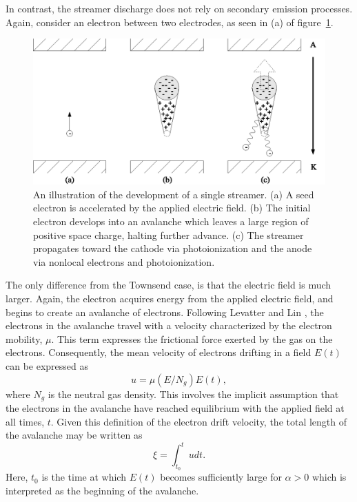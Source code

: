 {In contrast, the streamer discharge does not rely on secondary emission
processes. Again, consider an electron between two electrodes, as seen in (a) of
figure~\ref{fig:streamer}.
\begin{figure}
  \centering
  \includegraphics{./chapters/theory/figures/streamer.eps}
  \caption{An illustration of the development of a single streamer. (a)
    A seed electron is accelerated by the applied electric field. (b) The
    initial electron develops into an avalanche which leaves a large region
    of positive space charge, halting further advance. (c) The streamer
    propagates toward the cathode via photoionization and the anode via
    nonlocal electrons and photoionization.}
  \label{fig:streamer}
\end{figure}
The only difference from the Townsend case, is that the electric field is much
larger. Again, the electron acquires energy from the applied electric field, and
begins to create an avalanche of electrons. Following Levatter and Lin
\cite{Levatter1980}, the electrons in the avalanche travel with a velocity
characterized by the electron mobility, $\mu$. This term expresses the
frictional force exerted by the gas on the electrons. Consequently, the mean
velocity of electrons drifting in a field $E(t)$ can be expressed as
\begin{equation}
  u = \mu(E/N_g) E(t),
\end{equation}
where $N_g$ is the neutral gas density. This involves the implicit assumption
that the electrons in the avalanche have reached equilibrium with the applied
field at all times, $t$. Given this definition of the electron drift velocity,
the total length of the avalanche may be written as
\begin{equation}
  \xi = \int_{t_0}^t u dt.
  \label{eq:s_xi}
\end{equation}
Here, $t_0$ is the time at which $E(t)$ becomes sufficiently large for $\alpha >
0$ which is interpreted as the beginning of the avalanche.

}
